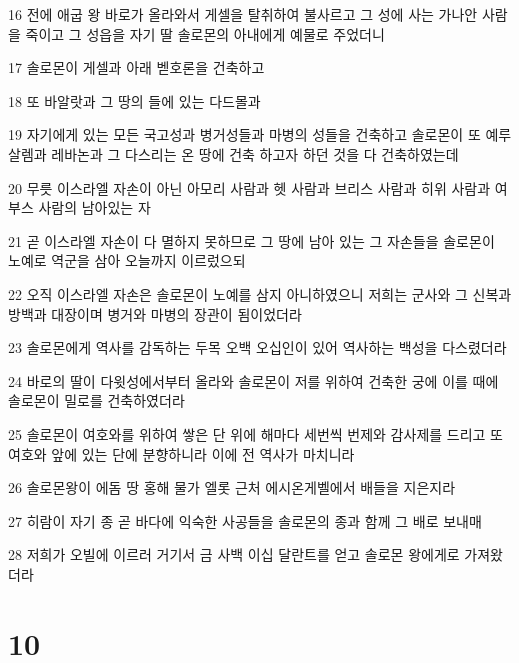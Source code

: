 \par 16 전에 애굽 왕 바로가 올라와서 게셀을 탈취하여 불사르고 그 성에 사는 가나안 사람을 죽이고 그 성읍을 자기 딸 솔로몬의 아내에게 예물로 주었더니
\par 17 솔로몬이 게셀과 아래 벧호론을 건축하고
\par 18 또 바알랏과 그 땅의 들에 있는 다드몰과
\par 19 자기에게 있는 모든 국고성과 병거성들과 마병의 성들을 건축하고 솔로몬이 또 예루살렘과 레바논과 그 다스리는 온 땅에 건축 하고자 하던 것을 다 건축하였는데
\par 20 무릇 이스라엘 자손이 아닌 아모리 사람과 헷 사람과 브리스 사람과 히위 사람과 여부스 사람의 남아있는 자
\par 21 곧 이스라엘 자손이 다 멸하지 못하므로 그 땅에 남아 있는 그 자손들을 솔로몬이 노예로 역군을 삼아 오늘까지 이르렀으되
\par 22 오직 이스라엘 자손은 솔로몬이 노예를 삼지 아니하였으니 저희는 군사와 그 신복과 방백과 대장이며 병거와 마병의 장관이 됨이었더라
\par 23 솔로몬에게 역사를 감독하는 두목 오백 오십인이 있어 역사하는 백성을 다스렸더라
\par 24 바로의 딸이 다윗성에서부터 올라와 솔로몬이 저를 위하여 건축한 궁에 이를 때에 솔로몬이 밀로를 건축하였더라
\par 25 솔로몬이 여호와를 위하여 쌓은 단 위에 해마다 세번씩 번제와 감사제를 드리고 또 여호와 앞에 있는 단에 분향하니라 이에 전 역사가 마치니라
\par 26 솔로몬왕이 에돔 땅 홍해 물가 엘롯 근처 에시온게벨에서 배들을 지은지라
\par 27 히람이 자기 종 곧 바다에 익숙한 사공들을 솔로몬의 종과 함께 그 배로 보내매
\par 28 저희가 오빌에 이르러 거기서 금 사백 이십 달란트를 얻고 솔로몬 왕에게로 가져왔더라

\chapter{10}

